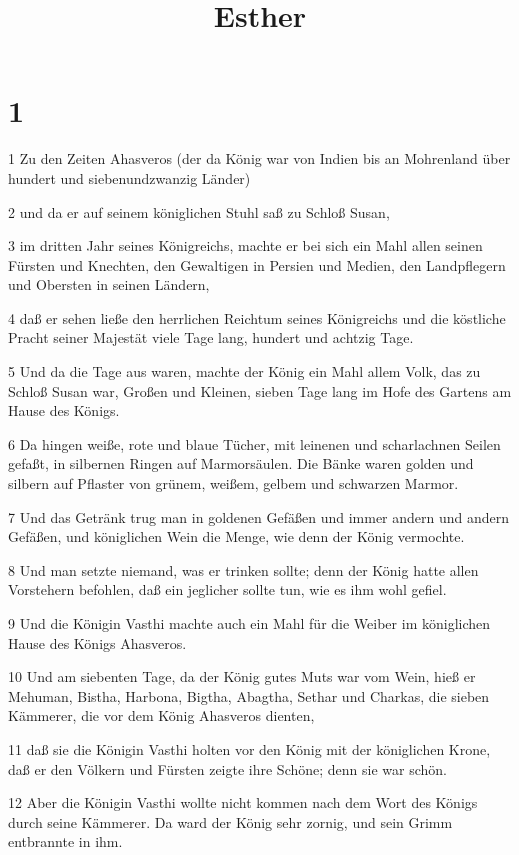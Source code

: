 

\title{Esther}


\chapter{1}

\par 1 Zu den Zeiten Ahasveros (der da König war von Indien bis an Mohrenland über hundert und siebenundzwanzig Länder)
\par 2 und da er auf seinem königlichen Stuhl saß zu Schloß Susan,
\par 3 im dritten Jahr seines Königreichs, machte er bei sich ein Mahl allen seinen Fürsten und Knechten, den Gewaltigen in Persien und Medien, den Landpflegern und Obersten in seinen Ländern,
\par 4 daß er sehen ließe den herrlichen Reichtum seines Königreichs und die köstliche Pracht seiner Majestät viele Tage lang, hundert und achtzig Tage.
\par 5 Und da die Tage aus waren, machte der König ein Mahl allem Volk, das zu Schloß Susan war, Großen und Kleinen, sieben Tage lang im Hofe des Gartens am Hause des Königs.
\par 6 Da hingen weiße, rote und blaue Tücher, mit leinenen und scharlachnen Seilen gefaßt, in silbernen Ringen auf Marmorsäulen. Die Bänke waren golden und silbern auf Pflaster von grünem, weißem, gelbem und schwarzen Marmor.
\par 7 Und das Getränk trug man in goldenen Gefäßen und immer andern und andern Gefäßen, und königlichen Wein die Menge, wie denn der König vermochte.
\par 8 Und man setzte niemand, was er trinken sollte; denn der König hatte allen Vorstehern befohlen, daß ein jeglicher sollte tun, wie es ihm wohl gefiel.
\par 9 Und die Königin Vasthi machte auch ein Mahl für die Weiber im königlichen Hause des Königs Ahasveros.
\par 10 Und am siebenten Tage, da der König gutes Muts war vom Wein, hieß er Mehuman, Bistha, Harbona, Bigtha, Abagtha, Sethar und Charkas, die sieben Kämmerer, die vor dem König Ahasveros dienten,
\par 11 daß sie die Königin Vasthi holten vor den König mit der königlichen Krone, daß er den Völkern und Fürsten zeigte ihre Schöne; denn sie war schön.
\par 12 Aber die Königin Vasthi wollte nicht kommen nach dem Wort des Königs durch seine Kämmerer. Da ward der König sehr zornig, und sein Grimm entbrannte in ihm.
